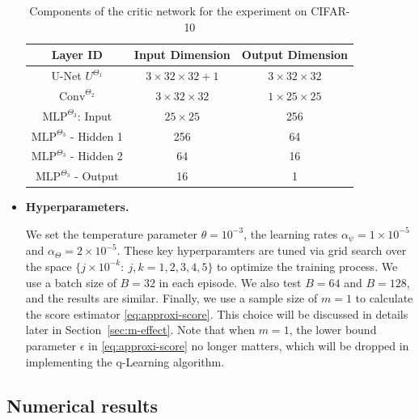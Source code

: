 \documentclass[11pt]{article}
\begin{document}
\begin{itemize}
\begin{table}[h]
    \centering
    \begin{tabular}{c | c c}
        \hline Layer ID & Input Dimension & Output Dimension \\
        \hline
        U-Net $U^{\Theta_1}$& $3 \times 32 \times 32 + 1$ & $3 \times 32 \times 32$\\
        $\text{Conv}^{\Theta_2}$ & $3 \times 32 \times 32$ & $1 \times 25 \times 25$\\
        $\text{MLP}^{\Theta_3}$: Input & $25 \times 25$ &  256\\
        $\text{MLP}^{\Theta_3}$ - Hidden 1 & 256 &  64\\
        $\text{MLP}^{\Theta_3}$ - Hidden 2 & 64 &  16\\	
         $\text{MLP}^{\Theta_3}$ - Output & 16 & 1\\ \hline
    \end{tabular}
    \captionsetup{justification=centering}
    \caption{Components of the critic network for the experiment on CIFAR-10}
    \label{table:NN_setting_cifar10}
\end{table}



\item \textbf{Hyperparameters.}

We set the temperature parameter $\theta=10^{-3}$, the learning rates $\alpha_\psi=1\times 10^{-5}$ and $\alpha_\Theta=2\times 10^{-5}$. These key hyperparamters are tuned via grid search over the space $\{j \times 10^{-k}:\  j, k =1,2 ,3, 4,5\}$ to optimize the training process.
We use a batch size of $B=32$ in each episode. We also test $B=64$ and $B=128$, and the results are similar.
Finally, we use a sample size of $m=1$ to calculate the score estimator \eqref{eq:approxi-score}. This choice will be discussed in details later in Section~\ref{sec:m-effect}. Note that when $m=1$, the lower bound parameter $\epsilon$ in \eqref{eq:approxi-score} no longer matters, which will be dropped in implementing the q-Learning algorithm.



\end{itemize}





\subsection{Numerical results}\label{sec:results-image}
\end{document}
